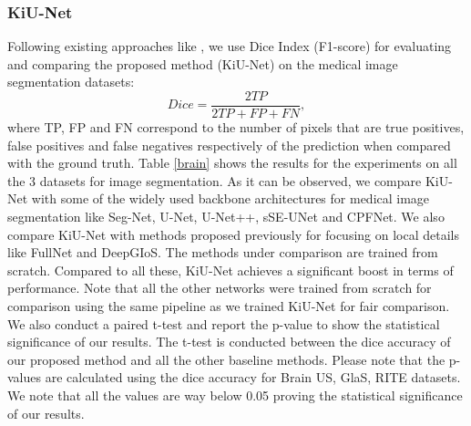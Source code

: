 \documentclass[journal,twoside,web]{ieeecolor}
\begin{document}
\subsubsection{KiU-Net}

Following existing approaches like \cite{zhou2019unet++}, we use Dice Index (F1-score) for evaluating and comparing the proposed method (KiU-Net) on the medical image segmentation datasets:
\[ Dice = \frac{2TP}{2TP+FP+FN},\]
where TP, FP and FN correspond to the number of pixels that are true positives, false positives and false negatives respectively of the prediction when compared with the ground truth. Table \ref{brain} shows  the results for the experiments on all the 3 datasets for image segmentation. As it can be observed, we compare KiU-Net with some of the widely used backbone architectures for medical image segmentation  like Seg-Net, U-Net, U-Net++, sSE-UNet and CPFNet. We also compare KiU-Net with methods proposed previously for focusing on local details like FullNet and DeepGIoS. The methods under comparison are trained from scratch. Compared to all these, KiU-Net achieves a significant boost in terms of performance. Note that all the other networks were trained from scratch for comparison using the same pipeline as we trained KiU-Net for fair comparison. We also conduct a paired t-test and report the p-value to show the statistical significance of our results. The t-test is conducted between the dice accuracy of our proposed method and all the other baseline methods. Please note that
the p-values are calculated using the dice accuracy for Brain US, GlaS, RITE datasets. We note that all the values are way below 0.05 proving the statistical significance of our results.
\end{document}
